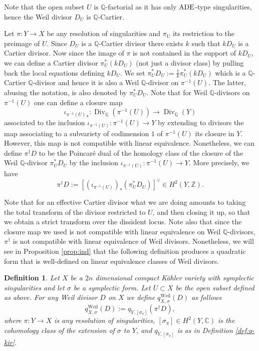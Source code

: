 \documentclass[12pt,reqno]{amsart}
\def\Z{{\mathbb Z}}
\def\Q{{\mathbb Q}}
\newtheorem{definition}[thm]{Definition}
\theoremstyle{plain}
\theoremstyle{definition}
\begin{document}
Note that the open subset $U$ is $\Q$-factorial as it has only ${\rm ADE}$-type singularities, hence the Weil divisor $D_{U}$ is $\Q$-Cartier.

Let $\pi :Y\to X$ be any resolution of singularities and $\pi_U$ its restriction to the preimage of $U$. Since $D_U$ is a $\Q$-Cartier divisor there exists $k$ such that $kD_U$ is a Cartier divisor. Now since the image of $\pi$ is not contained in the support of $kD_U$, we can define a Cartier divisor $\pi_U^* (kD_U)$ (not just a divisor class) by pulling back the local equations defining $kD_U$. We set $\pi_U^*D_U:=\frac{1}{k} \pi_U^* (kD_U)$  which is a $\Q$-Cartier $\Q$-divisor and hence it is also a Weil $\mathbb Q$-divisor on $\pi^{-1}(U)$. The latter, abusing the notation, is also denoted by $\pi_U^* D_U$. Note that for Weil $\mathbb Q$-divisors on $\pi^{-1}(U)$ one can define a closure map  $${\iota_{\pi^{-1}(U)}}_*: \operatorname{Div}_{\mathbb Q}(\pi^{-1}(U)) \to \operatorname{Div}_{\mathbb Q}(Y)$$ associated to the inclusion $\iota_{\pi^{-1}(U)}\colon \pi^{-1}(U)\to Y$ by extending to divisors the map associating to a subvariety of codimension $1$ of $\pi^{-1}(U)$ its closure in $Y$. However, this map is not compatible with linear equivalence. Nonetheless, we can define $\pi^{\dagger}D$ to be the Poincar\'e dual of the homology class of the closure of the Weil $\mathbb Q$-divisor $\pi_U^* D_U$ by the inclusion $\iota_{\pi^{-1}(U)}\colon \pi^{-1}(U)\to Y$. 
More precisely, we have
\begin{equation}\label{eq:dagger}
  \pi^{\dagger}D:=[(\iota_{\pi^{-1}(U)})_* (\pi_{U}^*D_U)]^{\vee}\in H^2(Y,\Z).  
\end{equation}

Note that for an effective Cartier divisor what we are doing amounts to taking the total transform of the divisor restricted to $U$, and then closing it up, so that we obtain a strict transform over the dissident locus. Note also that since the closure map we used is not compatible with linear equivalence on Weil $\mathbb Q $-divisors,   $\pi^{\dagger}$ is not compatible with linear equivalence of Weil divisors. Nonetheless, we will see in Proposition \ref{prop:ind} that the following definition produces a quadratic form that is well-defined on linear equivalence classes of Weil divisors.

\begin{definition}\label{def:q_on_Weil}
Let $X$ be a $2n$ dimensional compact K\"ahler variety with symplectic singularities 
and let $\sigma$ be a symplectic form. 
Let $U\subset X$ be the open subset defined as above. For any Weil divisor $D$ on $X$ we define 
$q_{X,\sigma}^{\textrm{Weil}}(D)$ as follows
$$
 q_{X,\sigma}^{\textrm{Weil}}(D):= q_{Y,[\sigma_{\pi}]}(\pi^{\dagger}D),
$$
where $\pi :Y\to X$ is any resolution of singularities, $[ \sigma_{\pi}]\in H^2(Y, \mathbb C)$ is the cohomology class of the extension of $\sigma$ to $Y$, 
and $q_{Y,[\sigma_{\pi}]}$ is as in Definition \ref{def:q-kir}.
\end{definition}
\end{document}
